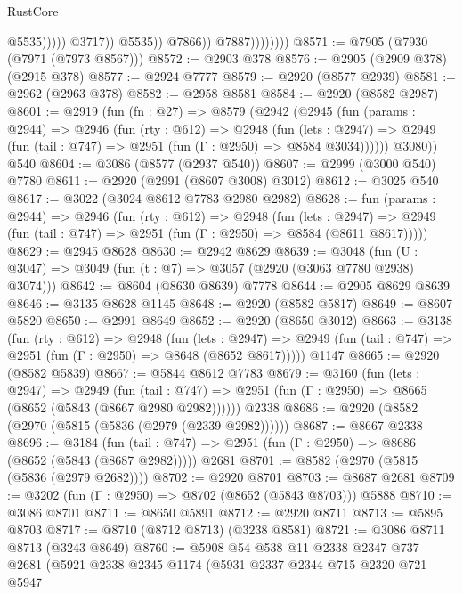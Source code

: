 \begin{lexlean}{RustCore}
\begin{coremodule}
                                          @5535)))))
                                @3717))
                            @5535))
                        @7866))
                    @7887))))))))
@8571 := @7905 (@7930 (@7971 (@7973 @8567)))
@8572 := @2903 @378
@8576 := @2905 (@2909 @378) (@2915 @378)
@8577 := @2924 @7777
@8579 := @2920 (@8577 @2939)
@8581 := @2962 (@2963 @378)
@8582 := @2958 @8581
@8584 := @2920 (@8582 @2987)
@8601 := @2919
    (fun (fn : @27) =>
    @8579
      (@2942
        (@2945
          (fun (params : @2944) =>
          @2946
            (fun (rty : @612) =>
            @2948
              (fun (lets : @2947) =>
              @2949 (fun (tail : @747) => @2951 (fun (Γ : @2950) => @8584 @3034))))))
        @3080))
    @540
@8604 := @3086 (@8577 (@2937 @540))
@8607 := @2999 (@3000 @540) @7780
@8611 := @2920 (@2991 (@8607 @3008) @3012)
@8612 := @3025 @540
@8617 := @3022 (@3024 @8612 @7783 @2980 @2982)
@8628 := fun (params : @2944) =>
  @2946
    (fun (rty : @612) =>
    @2948
      (fun (lets : @2947) =>
      @2949 (fun (tail : @747) => @2951 (fun (Γ : @2950) => @8584 (@8611 @8617)))))
@8629 := @2945 @8628
@8630 := @2942 @8629
@8639 := @3048 (fun (U : @3047) => @3049 (fun (t : @7) => @3057 (@2920 (@3063 @7780 @2938) @3074)))
@8642 := @8604 (@8630 @8639) @7778
@8644 := @2905 @8629 @8639
@8646 := @3135 @8628 @1145
@8648 := @2920 (@8582 @5817)
@8649 := @8607 @5820
@8650 := @2991 @8649
@8652 := @2920 (@8650 @3012)
@8663 := @3138
    (fun (rty : @612) =>
    @2948
      (fun (lets : @2947) =>
      @2949 (fun (tail : @747) => @2951 (fun (Γ : @2950) => @8648 (@8652 @8617)))))
    @1147
@8665 := @2920 (@8582 @5839)
@8667 := @5844 @8612 @7783
@8679 := @3160
    (fun (lets : @2947) =>
    @2949
      (fun (tail : @747) => @2951 (fun (Γ : @2950) => @8665 (@8652 (@5843 (@8667 @2980 @2982))))))
    @2338
@8686 := @2920 (@8582 (@2970 (@5815 (@5836 (@2979 (@2339 @2982))))))
@8687 := @8667 @2338
@8696 := @3184
    (fun (tail : @747) => @2951 (fun (Γ : @2950) => @8686 (@8652 (@5843 (@8687 @2982)))))
    @2681
@8701 := @8582 (@2970 (@5815 (@5836 (@2979 @2682))))
@8702 := @2920 @8701
@8703 := @8687 @2681
@8709 := @3202 (fun (Γ : @2950) => @8702 (@8652 (@5843 @8703))) @5888
@8710 := @3086 @8701
@8711 := @8650 @5891
@8712 := @2920 @8711
@8713 := @5895 @8703
@8717 := @8710 (@8712 @8713) (@3238 @8581)
@8721 := @3086 @8711 @8713 (@3243 @8649)
@8760 := @5908
    @54
    @538
    @11
    @2338
    @2347
    @737
    @2681
    (@5921
      @2338
      @2345
      @1174
      (@5931
        @2337
        @2344
        @715
        @2320
        @721
        @5947

\end{coremodule}
\end{lexlean}
